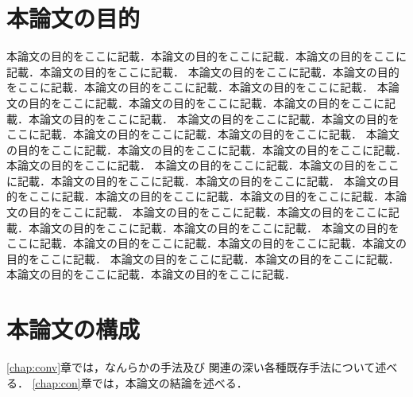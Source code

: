 \section{本論文の目的}
本論文の目的をここに記載．本論文の目的をここに記載．本論文の目的をここに記載．本論文の目的をここに記載．
本論文の目的をここに記載．本論文の目的をここに記載．本論文の目的をここに記載．本論文の目的をここに記載．
本論文の目的をここに記載．本論文の目的をここに記載．本論文の目的をここに記載．本論文の目的をここに記載．
本論文の目的をここに記載．本論文の目的をここに記載．本論文の目的をここに記載．本論文の目的をここに記載．
本論文の目的をここに記載．本論文の目的をここに記載．本論文の目的をここに記載．本論文の目的をここに記載．
本論文の目的をここに記載．本論文の目的をここに記載．本論文の目的をここに記載．本論文の目的をここに記載．
本論文の目的をここに記載．本論文の目的をここに記載．本論文の目的をここに記載．本論文の目的をここに記載．
本論文の目的をここに記載．本論文の目的をここに記載．本論文の目的をここに記載．本論文の目的をここに記載．
本論文の目的をここに記載．本論文の目的をここに記載．本論文の目的をここに記載．本論文の目的をここに記載．
本論文の目的をここに記載．本論文の目的をここに記載．本論文の目的をここに記載．本論文の目的をここに記載．

\section{本論文の構成}
\ref{chap:conv}章では，なんらかの手法\cite{Kitamura2016taslp}及び
関連の深い各種既存手法\cite{Kitamura2016IWAENC}について述べる．
\ref{chap:con}章では，本論文の結論を述べる．
